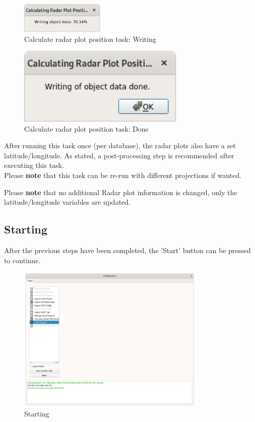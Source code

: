 {\begin{figure}[H]
  \center
    \includegraphics[width=4cm,frame]{../screenshots/task_calc_radar_write.png}
  \caption{Calculate radar plot position task: Writing}
\end{figure}

\begin{figure}[H]
  \center
    \includegraphics[width=8cm,frame]{../screenshots/task_calc_radar_done.png}
  \caption{Calculate radar plot position task: Done}
\end{figure}

After running this task once (per database), the radar plots also have a set latitude/longitude. As stated, a post-processing step is recommended after executing this task. \\

Please \textbf{note} that this task can be re-run with different projections if wanted.

Please \textbf{note} that no additional Radar plot information is changed, only the latitude/longitude variables are updated.
 

\subsection{Starting}

After the previous steps have been completed, the 'Start' button can be pressed to continue. \\

\begin{figure}[H]
  \center
    \includegraphics[width=9cm,frame]{../screenshots/start.png}
  \caption{Starting}
\end{figure}

}
